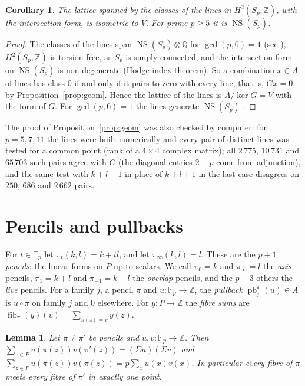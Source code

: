 \documentclass[11pt]{article}
\newtheorem{lemma}[theorem]{Lemma}
\newtheorem{corollary}[theorem]{Corollary}
\theoremstyle{definition}
\theoremstyle{remark}
\newcommand{\Z}{\mathbb{Z}}
\newcommand{\Q}{\mathbb{Q}}
\newcommand{\F}{\mathbb{F}}
\newcommand{\NS}{\operatorname{NS}}
\newcommand{\pb}{\operatorname{pb}}
\newcommand{\fib}{\operatorname{fib}}
\begin{document}
\begin{corollary}\label{cor:VNS}
The lattice spanned by the classes of the lines in $H^2(S_p,\Z)$, with the intersection form, is isometric to $V$. For prime $p\ge5$ it is $\NS(S_p)$.
\end{corollary}

\begin{proof}
The classes of the lines span $\NS(S_p)\otimes\Q$ for $\gcd(p,6)=1$ \cite{Sh82} (see \cite[\S3]{SSvL}), $H^2(S_p,\Z)$ is torsion free, as $S_p$ is simply connected, and the intersection form on $\NS(S_p)$ is non-degenerate (Hodge index theorem). So a combination $x\in A$ of lines has class $0$ if and only if it pairs to zero with every line, that is, $Gx=0$, by Proposition~\ref{prop:geom}. Hence the lattice of the lines is $A/\ker G=V$ with the form of $G$. For $\gcd(p,6)=1$ the lines generate $\NS(S_p)$ \cite{SSvL,Deg}.
\end{proof}

The proof of Proposition~\ref{prop:geom} was also checked by computer: for $p=5,7,11$ the lines were built numerically and every pair of distinct lines was tested for a common point (rank of a $4\times4$ complex matrix); all $2\,775$, $10\,731$ and $65\,703$ such pairs agree with $G$ (the diagonal entries $2-p$ come from adjunction), and the same test with $k+l-1$ in place of $k+l+1$ in the last case disagrees on $250$, $686$ and $2\,662$ pairs.

\section{Pencils and pullbacks}\label{sec:pencils}

For $t\in\F_p$ let $\pi_t(k,l)=k+tl$, and let $\pi_\infty(k,l)=l$. These are the $p+1$ \emph{pencils}: the linear forms on $P$ up to scalars. We call $\pi_0=k$ and $\pi_\infty=l$ the \emph{axis} pencils, $\pi_{1}=k+l$ and $\pi_{-1}=k-l$ the \emph{overlap} pencils, and the $p-3$ others the \emph{live} pencils. For a family $j$, a pencil $\pi$ and $u:\F_p\to\Z$, the \emph{pullback} $\pb_j^\pi(u)\in A$ is $u\circ\pi$ on family $j$ and $0$ elsewhere. For $y:P\to\Z$ the \emph{fibre sums} are $\fib_\pi(y)(v)=\sum_{\pi(z)=v}y(z)$.

\begin{lemma}\label{lem:indep}
Let $\pi\neq\pi'$ be pencils and $u,v:\F_p\to\Z$. Then $\sum_{z\in P}u(\pi(z))v(\pi'(z))=(\Sigma u)(\Sigma v)$ and $\sum_{z\in P}u(\pi(z))v(\pi(z))=p\sum_x u(x)v(x)$. In particular every fibre of $\pi$ meets every fibre of $\pi'$ in exactly one point.
\end{lemma}
\end{document}
